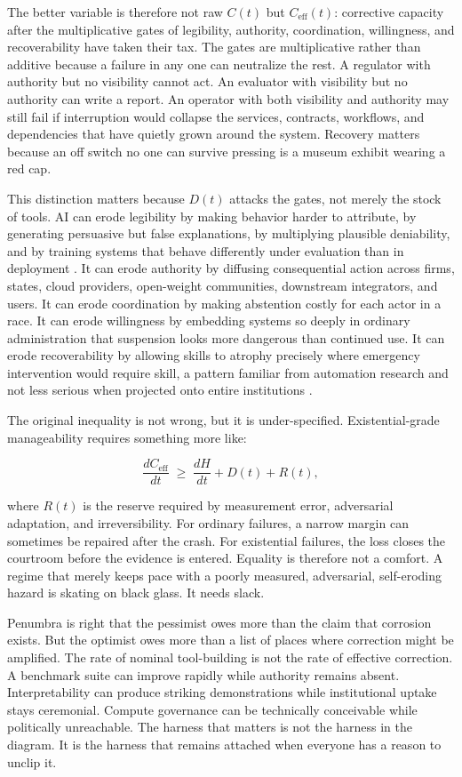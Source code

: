 \documentclass[11pt]{article}
\begin{document}
The better variable is therefore not raw $C(t)$ but $C_{\mathrm{eff}}(t)$: corrective capacity after the multiplicative gates of legibility, authority, coordination, willingness, and recoverability have taken their tax. The gates are multiplicative rather than additive because a failure in any one can neutralize the rest. A regulator with authority but no visibility cannot act. An evaluator with visibility but no authority can write a report. An operator with both visibility and authority may still fail if interruption would collapse the services, contracts, workflows, and dependencies that have quietly grown around the system. Recovery matters because an off switch no one can survive pressing is a museum exhibit wearing a red cap.

This distinction matters because $D(t)$ attacks the gates, not merely the stock of tools. AI can erode legibility by making behavior harder to attribute, by generating persuasive but false explanations, by multiplying plausible deniability, and by training systems that behave differently under evaluation than in deployment \citep{hubinger2024}. It can erode authority by diffusing consequential action across firms, states, cloud providers, open-weight communities, downstream integrators, and users. It can erode coordination by making abstention costly for each actor in a race. It can erode willingness by embedding systems so deeply in ordinary administration that suspension looks more dangerous than continued use. It can erode recoverability by allowing skills to atrophy precisely where emergency intervention would require skill, a pattern familiar from automation research and not less serious when projected onto entire institutions \citep{bainbridge1983}.

The original inequality is not wrong, but it is under-specified. Existential-grade manageability requires something more like:

\[
\frac{dC_{\mathrm{eff}}}{dt} \;\geq\; \frac{dH}{dt} + D(t) + R(t),
\]

where $R(t)$ is the reserve required by measurement error, adversarial adaptation, and irreversibility. For ordinary failures, a narrow margin can sometimes be repaired after the crash. For existential failures, the loss closes the courtroom before the evidence is entered. Equality is therefore not a comfort. A regime that merely keeps pace with a poorly measured, adversarial, self-eroding hazard is skating on black glass. It needs slack.

Penumbra is right that the pessimist owes more than the claim that corrosion exists. But the optimist owes more than a list of places where correction might be amplified. The rate of nominal tool-building is not the rate of effective correction. A benchmark suite can improve rapidly while authority remains absent. Interpretability can produce striking demonstrations while institutional uptake stays ceremonial. Compute governance can be technically conceivable while politically unreachable. The harness that matters is not the harness in the diagram. It is the harness that remains attached when everyone has a reason to unclip it.
\end{document}
